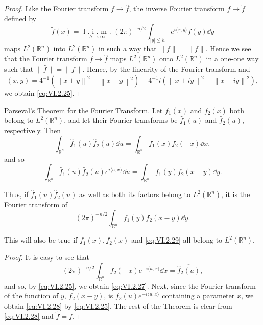 \begin{proof}
 Like the Fourier transform $f \to \hat{f}$, the inverse Fourier transform $f \to \tilde{f}$ defined by 
\begin{equation}\label{eq:VI.2.26}
\tilde {f} (x) = \underset {h \rightarrow \infty} {\text{ l . i . m . }} (2 \pi) ^{-n/2} \int_{| y | \leqq h} e ^{i \langle x, y \rangle} f (y) \dd y
\end{equation}
maps $L^2(\mathbb{R}^{n})$ into $L^2(\mathbb{R}^{n})$ in such a way that $\|\tilde{f}\| = \|f\|$. Hence we see that the Fourier transform $f \to \hat{f}$ maps $L^2(\mathbb{R}^{n})$ onto $L^2(\mathbb{R}^{n})$ in a one-one way such that $\|\hat{f}\| = \|f\|$. Hence, by the linearity of the Fourier transform and 
\[
(x, y) = 4 ^{-1} \left(\left\| x + y \right\| ^{2} - \left\| x - y \right\| ^{2}\right) + 4 ^{-1} i \left(\left\| x + i y \right\| ^{2} - \left\| x - i y \right\| ^{2}\right),
\]
we obtain \eqref{eq:VI.2.25}. 
\end{proof}

Parseval's Theorem for the Fourier Transform. Let $f_{1}(x)$ and $f_{2}(x)$ both belong to $L^2(\mathbb{R}^{n})$, and let their Fourier transforms be $\hat{f}_1(u)$ and $\hat{f}_2(u)$, respectively. Then 
\begin{equation}\label{eq:VI.2.27}
\int_ {\mathbb{R}^{n}} \hat {f} _{1} (u) \hat {f} _{2} (u) \dd u = \int_ {\mathbb{R}^{n}} f _{1} (x) f _{2} (- x) \dd x,
\end{equation}
and so 
\begin{equation}\label{eq:VI.2.28}
\int_ {\mathbb{R}^{n}} \hat {f} _{1} (u) \hat {f} _{2} (u) e ^{i \langle u, x \rangle} \dd u = \int_ {\mathbb{R}^{n}} f _{1} (y) f _{2} (x - y) \dd y.
\end{equation}

Thus, if $\hat{f}_1(u)\hat{f}_2(u)$ as well as both its factors belong to $L^2 (\mathbb{R}^{n})$, it is the Fourier transform of 
\begin{equation}\label{eq:VI.2.29}
(2 \pi) ^{-n/2} \int_ {\mathbb{R}^{n}} f _{1} (y) f _{2} (x - y) \dd y.
\end{equation}

This will also be true if $f_{1}(x), f_{2}(x)$ and \eqref{eq:VI.2.29} all belong to $L^2(\mathbb{R}^{n})$. 

\begin{proof}
 It is easy to see that 
\[
(2 \pi) ^{-n/2} \int_ {\mathbb{R}^{n}} \overline {{f _{2} (- x)}} e ^{- i \langle u, x \rangle} \dd x = \overline {{\hat {f} _{2} (u)}},
\]
and so, by \eqref{eq:VI.2.25}, we obtain \eqref{eq:VI.2.27}. Next, since the Fourier transform of the function of $y$, $\overline{f_2(x - y)}$, is $\overline{f_2(u)} e^{-i\langle u,x\rangle}$ containing a parameter $x$, we obtain \eqref{eq:VI.2.28} by \eqref{eq:VI.2.25}. The rest of the Theorem is clear from \eqref{eq:VI.2.28} and $\widetilde{f} = f$. 
\end{proof}

